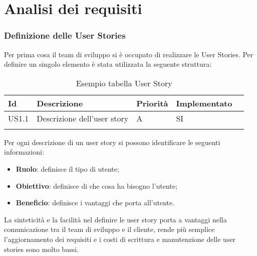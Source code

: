 
\chapter{Analisi dei requisiti}
\label{cap:analisi-requisiti}
\subsection{Definizione delle User Stories}
Per prima cosa il team di sviluppo si è occupato di realizzare le User Stories. Per definire un singolo elemento è stata utilizzata la seguente struttura:
\begin{longtable} {
		|>{}p{10mm}| 
		|>{}p{70mm}|
		|>{}p{15mm}|
		|>{}p{25mm}|
		>{}p{0mm}}
	\hline
	\textbf{Id} & \textbf{Descrizione} & \textbf{Priorità} & \textbf{Implementato} \\ \hline
	US1.1 & Descrizione dell'user story & A & SI \\ \hline
	\hline
	\caption{Esempio tabella User Story}
\end{longtable}
\noindent
Per ogni descrizione di un user story si possono identificare le seguenti informazioni:
\begin{itemize}
	\item \textbf{Ruolo}: definisce il tipo di utente;
	\item \textbf{Obiettivo}: definisce di che cosa ha bisogno l'utente;
	\item \textbf{Beneficio}: definisce i vantaggi che porta all'utente.
\end{itemize} 
\noindent
La sinteticità e la facilità nel definire le user story porta a vantaggi nella comunicazione tra il team di sviluppo e il cliente, rende più semplice l'aggiornamento dei requisiti e i costi di scrittura e manutenzione delle user stories sono molto bassi.

